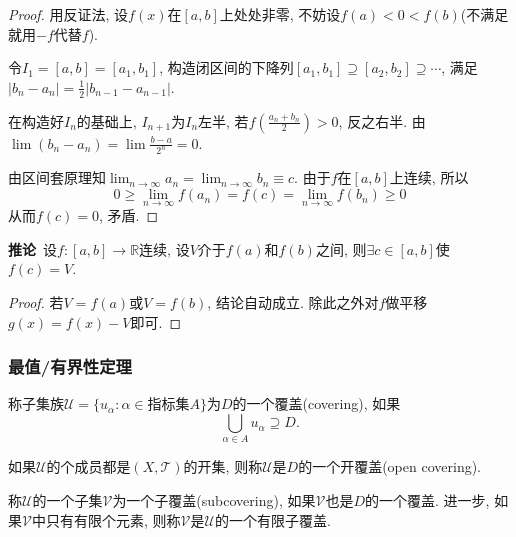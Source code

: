 \begin{proof}
    用反证法, 设$f\left( x \right) $在$\left[ a,b \right] $上处处非零, 不妨设$f\left( a \right) < 0 < f\left( b \right) $(不满足就用$-f$代替$f$).

    令$I_1 = \left[ a,b \right] = \left[ a_1,b_1 \right] $, 构造闭区间的下降列$\left[ a_1,b_1 \right] \supseteq \left[ a_2,b_2 \right] \supseteq \cdots $, 满足$\left| b_n - a_n \right| = \frac{1}{2} \left| b_{n-1} - a_{n-1} \right| $.

    在构造好$I_n$的基础上, $I_{n+1}$为$I_n$左半, 若$f\left( \frac{a_n + b_n}{2} \right) > 0$, 反之右半. 由$\lim \left( b_n - a_n \right)  = \lim \frac{b-a}{2^{n}} = 0 $.
    
    由区间套原理知$\displaystyle \lim_{n \to \infty} a_n = \lim_{n \to \infty}b_n \equiv  c$. 由于$f$在$\left[ a,b \right] $上连续, 所以
    \begin{equation}
        0\ge   \lim_{n \to \infty} f\left( a_n \right) = f\left( c \right) = \lim_{n \to \infty} f\left( b_n \right) \ge 0
    \end{equation}
    从而$f\left( c \right) = 0$, 矛盾.
\end{proof}

\textbf{推论}\ 设$f\colon [ a,b ] \to  \mathbb{R}$连续, 设$V$介于$f\left( a \right) $和$f\left( b \right) $之间, 则$\exists c \in \left[ a,b \right] $使 $f\left( c \right) = V$.
\begin{proof}
    若$V = f\left( a \right) $或$V = f\left( b \right) $, 结论自动成立. 除此之外对$f$做平移$g\left( x \right)  = f\left( x \right)  - V$即可.
\end{proof}

\subsubsection{最值/有界性定理}

\begin{definition}
    称子集族$\mathscr{U} = \{ u_{\alpha} \colon \alpha \in \text{指标集}A \}$为$D$的一个覆盖(covering), 如果
    \begin{equation}
        \bigcup_{\alpha \in A} u_{\alpha} \supseteq D .
    \end{equation}

    如果$\mathscr{U}$的个成员都是$(X, \mathscr{T})$的开集, 则称$\mathscr{U}$是$D$的一个开覆盖(open covering).

    称$\mathscr{U}$的一个子集$\mathscr{V}$为一个子覆盖(subcovering), 如果$\mathscr{V}$也是$D$的一个覆盖. 进一步, 如果$\mathscr{V}$中只有有限个元素, 则称$\mathscr{V}$是$\mathscr{U}$的一个有限子覆盖.
\end{definition}

